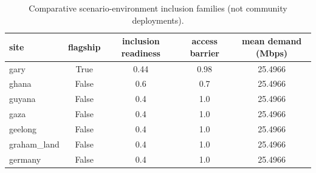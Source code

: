 \begin{table}[h]
\centering
\caption{Comparative scenario-environment inclusion families (not community deployments).}
\begin{tabular}{lcccc}\toprule
site & flagship & inclusion readiness & access barrier & mean demand (Mbps) \\\midrule
gary & True & 0.44 & 0.98 & 25.4966 \\
ghana & False & 0.6 & 0.7 & 25.4966 \\
guyana & False & 0.4 & 1.0 & 25.4966 \\
gaza & False & 0.4 & 1.0 & 25.4966 \\
geelong & False & 0.4 & 1.0 & 25.4966 \\
graham\_land & False & 0.4 & 1.0 & 25.4966 \\
germany & False & 0.4 & 1.0 & 25.4966 \\
\bottomrule\end{tabular}
\end{table}
